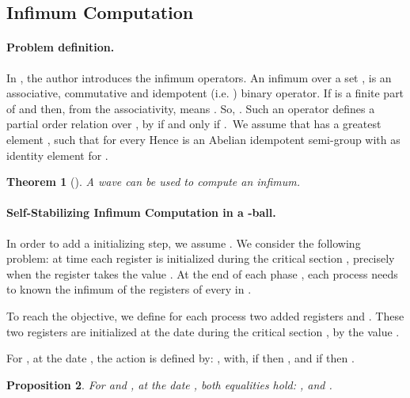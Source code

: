 \documentclass[11pt]{article}
\newtheorem{theorem}{Theorem}[section]
\newtheorem{proposition}[theorem]{Proposition}
\begin{document}
\subsection{Infimum Computation}
\label{ssec:infimum_calcul}

\paragraph{Problem definition.}
In \cite{T88,Tel94}, the author introduces the infimum
operators. An infimum  over a set , is an associative,
commutative and idempotent (i.e. ) binary operator. 
If  is a finite part of  and   then, from the associativity,
 means .  So, . 
Such an operator defines a partial order relation  over ,
by   if and only if .\ We assume that 
has a greatest element , such that  
for every  Hence  is an Abelian
idempotent semi-group with  as identity element for . 



\begin{theorem}[\cite{T88,Tel94}]
\label{th:infimum}
A wave can be used to compute an infimum.
\end{theorem}






\paragraph{Self-Stabilizing Infimum Computation in a -ball.}

In order to  add a initializing step, we assume . 
We consider the following problem: at time  each register  is initialized during the critical
section , precisely when the register 
 takes the value . At the end of each phase   , each process 
needs to known the infimum of the registers  of every
 in .

To reach the objective, we define for each process  two added registers 
 and . These two registers are initialized  at the date  during the critical section , by the value .

For , at the date , 
the action  is defined by:\newline
\noindent
,
with,  if  then  , and if   
then .


\begin{proposition}
For  and , at the date
, both equalities hold:\newline
\noindent 
 ,
and  . 
\end{proposition}
\end{document}
